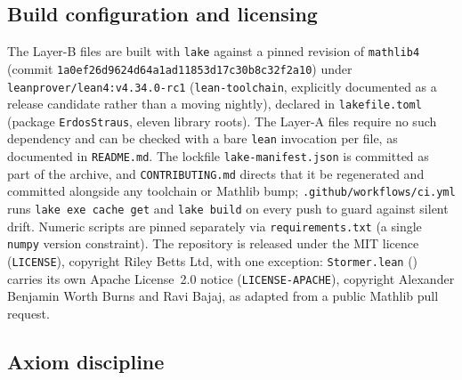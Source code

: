 \documentclass[11pt]{article}
\theoremstyle{plain}
\theoremstyle{definition}
\theoremstyle{remark}
\newcommand{\file}[1]{\texttt{#1}}
\newcommand{\lean}[1]{\texttt{#1}}
\renewcommand{\_}{\textunderscore\allowbreak}
\begin{document}
\subsection{Build configuration and licensing}

The Layer-B files are built with \texttt{lake} against a pinned revision of \texttt{mathlib4}
(commit \texttt{1a0ef26d9624d64a1ad11853d17c30b8c32f2a10}) under
\texttt{leanprover/lean4:v4.34.0-rc1} (\file{lean-toolchain}, explicitly documented as a release
candidate rather than a moving nightly), declared in \file{lakefile.toml} (package
\texttt{ErdosStraus}, eleven library roots). The Layer-A files require no such dependency and
can be checked with a bare \texttt{lean} invocation per file, as documented in \file{README.md}.
The lockfile \file{lake-manifest.json} is committed as part of the archive, and
\file{CONTRIBUTING.md} directs that it be regenerated and committed alongside any toolchain or
Mathlib bump; \file{.github/workflows/ci.yml} runs \texttt{lake exe cache get} and
\texttt{lake build} on every push to guard against silent drift. Numeric scripts are pinned
separately via \file{requirements.txt} (a single \texttt{numpy} version constraint). The
repository is released under the MIT licence (\file{LICENSE}), copyright Riley Betts Ltd, with
one exception: \lean{Stormer.lean} () carries its own Apache License~2.0
notice (\file{LICENSE-APACHE}), copyright Alexander Benjamin Worth Burns and Ravi Bajaj, as
adapted from a public Mathlib pull request.

\subsection{Axiom discipline}
\label{subsec:axioms}
\end{document}
